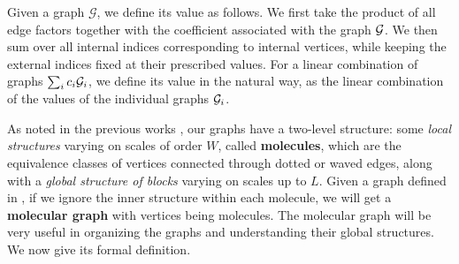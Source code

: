 \begin{definition}\label{ValG} 
Given a graph $\mathcal G$, we define its value as follows. We first take the product of all edge factors together with the coefficient associated with the graph $\cal G$. We then sum over all internal indices corresponding to internal vertices, while keeping the external indices fixed at their prescribed values.
For a linear combination of graphs $\sum_i c_i \cal G_i$, we define its value in the natural way, as the linear combination of the values of the individual graphs $\cal G_i$.

\end{definition}


As noted in the previous works \cite{yang2021delocalization,yang2022delocalization,Xu:2024aa,yang2021random}, our graphs have a two-level structure: some \emph{local structures} varying on scales of order $W$, called {\bf molecules}, which are the equivalence classes of vertices connected through dotted or waved edges, along with a \emph{global structure of blocks} varying on scales up to $L$. 
Given a graph defined in , if we ignore the inner structure within each molecule, we will get a {\bf molecular graph} with vertices being molecules. The molecular graph will be very useful in organizing the graphs and understanding their global structures. We now give its formal definition.


